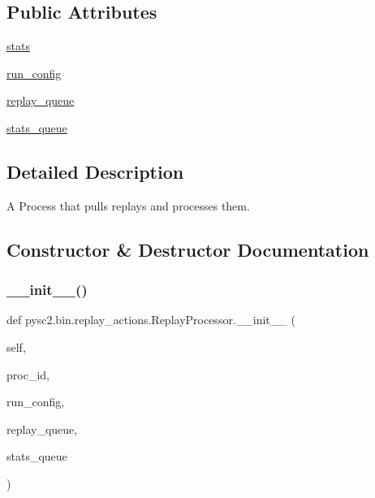 \subsection*{Public Attributes}
\begin{DoxyCompactItemize}
\item 
\mbox{\hyperlink{classpysc2_1_1bin_1_1replay__actions_1_1_replay_processor_a373f2c1abcccf2e8e74a14f3922a6bf7}{stats}}
\item 
\mbox{\hyperlink{classpysc2_1_1bin_1_1replay__actions_1_1_replay_processor_a8903821002ce6c7057910d79cb809cac}{run\+\_\+config}}
\item 
\mbox{\hyperlink{classpysc2_1_1bin_1_1replay__actions_1_1_replay_processor_a8d178d30db8f674180796af093c627d1}{replay\+\_\+queue}}
\item 
\mbox{\hyperlink{classpysc2_1_1bin_1_1replay__actions_1_1_replay_processor_a078296122e07fc1609673f321cf3f9d1}{stats\+\_\+queue}}
\end{DoxyCompactItemize}


\subsection{Detailed Description}
\begin{DoxyVerb}A Process that pulls replays and processes them.\end{DoxyVerb}
 

\subsection{Constructor \& Destructor Documentation}
\mbox{\label{classpysc2_1_1bin_1_1replay__actions_1_1_replay_processor_a8640877e968c8b982a66f28ce5c3f775}} 
\subsubsection{\texorpdfstring{\+\_\+\+\_\+init\+\_\+\+\_\+()}{\_\_init\_\_()}}
{\footnotesize\ttfamily def pysc2.\+bin.\+replay\+\_\+actions.\+Replay\+Processor.\+\_\+\+\_\+init\+\_\+\+\_\+ (\begin{DoxyParamCaption}\item[{}]{self,  }\item[{}]{proc\+\_\+id,  }\item[{}]{run\+\_\+config,  }\item[{}]{replay\+\_\+queue,  }\item[{}]{stats\+\_\+queue }\end{DoxyParamCaption})}



